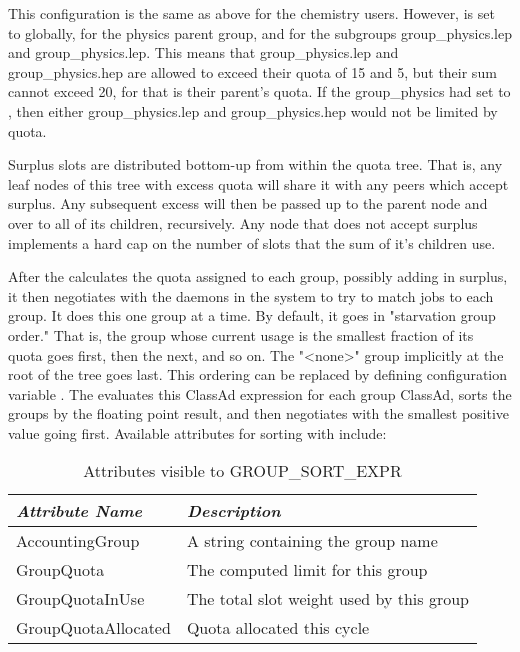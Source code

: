 This configuration is the same as above for the chemistry users.
However,  is set to  globally, 
 for the physics parent group, 
and  for the subgroups group\_physics.lep and group\_physics.lep.
This means that group\_physics.lep and group\_physics.hep
are allowed to exceed their quota of 15 and 5, 
but their sum cannot exceed 20, for that is their parent's quota.
If the group\_physics had  set to ,
then either group\_physics.lep and group\_physics.hep would not 
be limited by quota.  

Surplus slots are distributed bottom-up from within the quota tree.
That is, any leaf nodes of this tree with 
excess quota will share it with any peers which accept surplus. 
Any subsequent excess will then be 
passed up to the parent node and over to all of its children, recursively.
Any node that does not accept surplus implements a hard cap on the 
number of slots that the sum of it's children use.

After the  calculates the quota assigned to each group, 
possibly adding in surplus, 
it then negotiates with the  daemons in the system to 
try to match jobs to each group.
It does this one group at a time.  
By default, it goes in "starvation group order." 
That is, the group whose current usage is the smallest fraction of its
quota goes first, then the next, and so on.  
The "<none>" group implicitly at the root of the tree goes last.
This ordering can be replaced by defining configuration variable
.
The  evaluates this ClassAd expression for each group 
ClassAd, 
sorts the groups by the floating point result, 
and then negotiates with the smallest positive value going first.
Available attributes for sorting with  include:

\begin{table}[ht]
\centering
\caption{\label{table:group-sort-expr-attrs}Attributes visible to GROUP\_SORT\_EXPR}
\begin{tabular}{|l|l|} \hline
\emph{Attribute Name} & \emph{Description} \\ \hline \hline
AccountingGroup   &   A string containing the group name   \\ \hline
GroupQuota  &   The computed limit for this group \\ \hline
GroupQuotaInUse &   The total slot weight used by this group\\ \hline
GroupQuotaAllocated &   Quota allocated this cycle \\ \hline
\end{tabular}
\end{table}
%
\clearpage

